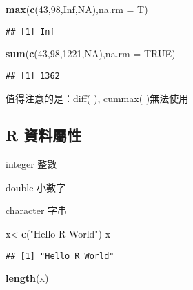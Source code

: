 \documentclass[]{article}
\newenvironment{Shaded}{\begin{snugshade}}{\end{snugshade}}
\newcommand{\DataTypeTok}[1]{\textcolor[rgb]{0.13,0.29,0.53}{#1}}
\newcommand{\DecValTok}[1]{\textcolor[rgb]{0.00,0.00,0.81}{#1}}
\newcommand{\KeywordTok}[1]{\textcolor[rgb]{0.13,0.29,0.53}{\textbf{#1}}}
\newcommand{\NormalTok}[1]{#1}
\newcommand{\OtherTok}[1]{\textcolor[rgb]{0.56,0.35,0.01}{#1}}
\newcommand{\StringTok}[1]{\textcolor[rgb]{0.31,0.60,0.02}{#1}}
\begin{document}
\begin{Shaded}
\begin{Highlighting}[]
\KeywordTok{max}\NormalTok{(}\KeywordTok{c}\NormalTok{(}\DecValTok{43}\NormalTok{,}\DecValTok{98}\NormalTok{,}\OtherTok{Inf}\NormalTok{,}\OtherTok{NA}\NormalTok{),}\DataTypeTok{na.rm =}\NormalTok{ T)}
\end{Highlighting}
\end{Shaded}

\begin{verbatim}
## [1] Inf
\end{verbatim}

\begin{Shaded}
\begin{Highlighting}[]
\KeywordTok{sum}\NormalTok{(}\KeywordTok{c}\NormalTok{(}\DecValTok{43}\NormalTok{,}\DecValTok{98}\NormalTok{,}\DecValTok{1221}\NormalTok{,}\OtherTok{NA}\NormalTok{),}\DataTypeTok{na.rm =} \OtherTok{TRUE}\NormalTok{)}
\end{Highlighting}
\end{Shaded}

\begin{verbatim}
## [1] 1362
\end{verbatim}

值得注意的是：diff( ), cummax( )無法使用

\hypertarget{r-ux8cc7ux6599ux5c6cux6027}{%
\subsection{R 資料屬性}\label{r-ux8cc7ux6599ux5c6cux6027}}

integer 整數

double 小數字

character 字串

\begin{Shaded}
\begin{Highlighting}[]
\NormalTok{x<-}\KeywordTok{c}\NormalTok{(}\StringTok{"Hello R World"}\NormalTok{)}
\NormalTok{x}
\end{Highlighting}
\end{Shaded}

\begin{verbatim}
## [1] "Hello R World"
\end{verbatim}

\begin{Shaded}
\begin{Highlighting}[]
\KeywordTok{length}\NormalTok{(x)}
\end{Highlighting}
\end{Shaded}
\end{document}
